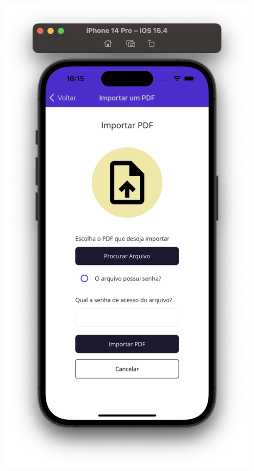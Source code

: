     \vspace{\baselineskip}
    \begin{center}
        \begin{minipage}{0.4\textwidth}
            \centering
            \includegraphics[scale=0.2]{figs/figura24.png}
            \label{fig:figura24}
        \end{minipage}%

\end{center}
